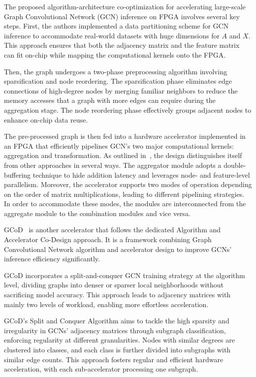 The proposed algorithm-architecture co-optimization for accelerating large-scale Graph Convolutional Network (GCN) inference on FPGA involves several key steps.
First, the authors implemented a data partitioning scheme for GCN inference to accommodate real-world datasets with huge dimensions for $A$ and $X$.
This approach ensures that both the adjacency matrix and the feature matrix can fit on-chip while mapping the computational kernels onto the FPGA\@.

Then, the graph undergoes a two-phase preprocessing algorithm involving sparsification and node reordering. 
The sparsification phase eliminates edge connections of high-degree nodes by merging familiar neighbors to reduce the memory accesses that a graph with more edges can require during the aggregation stage.
The node reordering phase effectively groups adjacent nodes to enhance on-chip data reuse.

The pre-processed graph is then fed into a hardware accelerator implemented in an FPGA that efficiently pipelines GCN's two major computational kernels: aggregation and transformation.
As outlined in~\cite{DBLP:journals/corr/abs-2010-00130}, the design distinguishes itself from other approaches in several ways.
The aggregator module adopts a double-buffering technique to hide addition latency and leverages node- and feature-level parallelism.
Moreover, the accelerator supports two modes of operation depending on the order of matrix multiplications, leading to different pipelining strategies.
In order to accommodate these modes, the modules are interconnected from the aggregate module to the combination modules and vice versa.

GCoD~\cite{9773223} is another accelerator that follows the dedicated Algorithm and Accelerator Co-Design approach.
It is a framework combining Graph Convolutional Network algorithm and accelerator design to improve GCNs' inference efficiency significantly.

GCoD incorporates a split-and-conquer GCN training strategy at the algorithm level, dividing graphs into denser or sparser local neighborhoods without sacrificing model accuracy.
This approach leads to adjacency matrices with mainly two levels of workload, enabling more effortless acceleration.

GCoD's Split and Conquer Algorithm aims to tackle the high sparsity and irregularity in GCNs' adjacency matrices through subgraph classification, enforcing regularity at different granularities.
Nodes with similar degrees are clustered into classes, and each class is further divided into subgraphs with similar edge counts.
This approach fosters regular and efficient hardware acceleration, with each sub-accelerator processing one subgraph.

